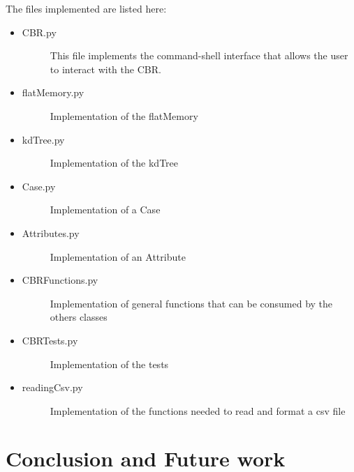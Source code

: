 \documentclass[11pt]{article}
\begin{document}
The files implemented are listed here:
\begin{itemize}
    \item \begin{description}
            \item[CBR.py] This file implements the command-shell interface that allows the user to interact with the CBR.
        \end{description}
    \item \begin{description}
            \item[flatMemory.py] Implementation of the flatMemory
        \end{description}
    \item \begin{description}
            \item[kdTree.py] Implementation of the kdTree
        \end{description}
    \item \begin{description}
            \item[Case.py] Implementation of a Case
        \end{description}
    \item \begin{description}
            \item[Attributes.py] Implementation of an Attribute
        \end{description}
    \item \begin{description}
            \item[CBRFunctions.py] Implementation of general functions that can be consumed by the others classes
        \end{description}
    \item \begin{description}
            \item[CBRTests.py] Implementation of the tests
        \end{description}
    \item \begin{description}
            \item[readingCsv.py] Implementation of the functions needed to read and format a csv file
        \end{description}


\end{itemize}

\section{Conclusion and Future work}
\end{document}

